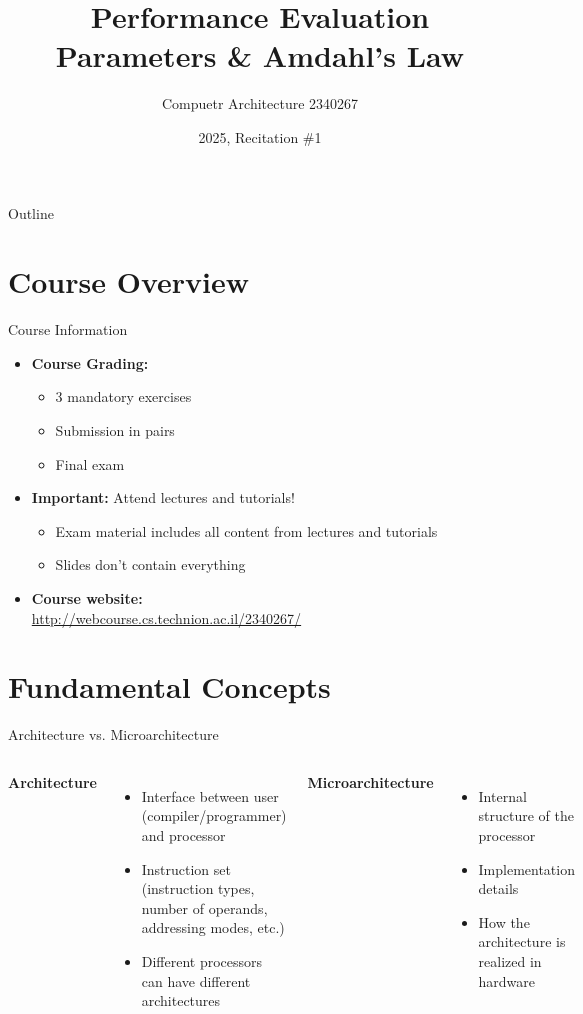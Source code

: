 \documentclass[aspectratio=169,12pt]{beamer}
\title{Performance Evaluation Parameters \& Amdahl's Law}
\author{Compuetr Architecture 2340267}
\date{2025, Recitation \#1}
\begin{document}
\frame{\titlepage}

\begin{frame}{Outline}
\tableofcontents
\end{frame}

\section{Course Overview}
\begin{frame}{Course Information}
\begin{itemize}
    \item \textbf{Course Grading:}
    \begin{itemize}
        \item 3 mandatory exercises
        \item Submission in pairs
        \item Final exam
    \end{itemize}
    \item \textbf{Important:} Attend lectures and tutorials!
    \begin{itemize}
        \item Exam material includes all content from lectures and tutorials
        \item Slides don't contain everything
    \end{itemize}
    \item \textbf{Course website:}\\
    \url{http://webcourse.cs.technion.ac.il/2340267/}
\end{itemize}
\end{frame}

\section{Fundamental Concepts}
\begin{frame}{Architecture vs. Microarchitecture}
\begin{columns}
\textbf{Architecture}
\begin{itemize}
    \item Interface between user (compiler/programmer) and processor
    \item Instruction set (instruction types, number of operands, addressing modes, etc.)
    \item Different processors can have different architectures
\end{itemize}

\textbf{Microarchitecture}
\begin{itemize}
    \item Internal structure of the processor
    \item Implementation details
    \item How the architecture is realized in hardware
\end{itemize}
\end{columns}
\end{frame}
\end{document}
